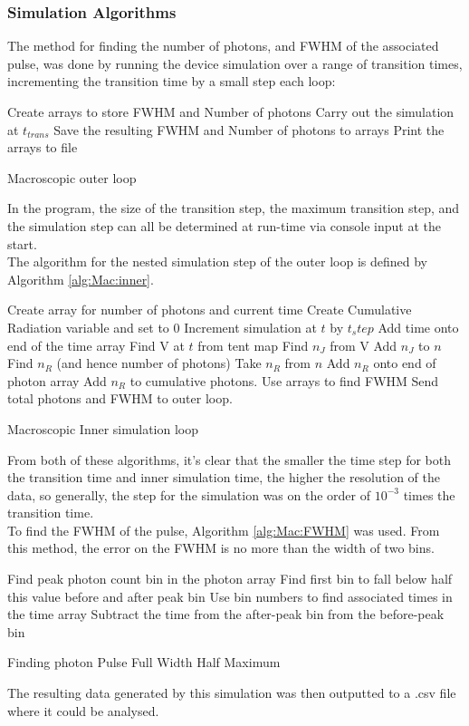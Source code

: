 \documentclass[titlepage]{article}
\begin{document}
\subsubsection{Simulation Algorithms}
The method for finding the number of photons, and FWHM of the associated pulse, was done by running the device simulation over a range of transition times, incrementing the transition time by a small step each loop:\\
\begin{algorithm}[H]
	Create arrays to store FWHM and Number of photons\; 
	{
		Carry out the simulation at $t_{trans}$\;
		Save the resulting FWHM and Number of photons to arrays\;
	}
	Print the arrays to file\;
	\caption{Macroscopic outer loop \label{alg:Mac:outer}}
\end{algorithm}
\bigskip
In the program, the size of the transition step, the maximum transition step, and the simulation step can all be determined at run-time via console input at the start.\\
The algorithm for the nested simulation step of the outer loop is defined by Algorithm \ref{alg:Mac:inner}.\\
\begin{algorithm}[H]
	Create array for number of photons and current time\;
	Create Cumulative Radiation variable and set to 0\;
	{
		Increment simulation at $t$ by $t_step$\;
		Add time onto end of the time array\;
		Find V at $t$ from tent map\;
		Find $n_J$ from V \;
		Add $n_J$ to $n$\;
		Find $n_R$ (and hence number of photons)\;
		Take $n_R$ from $n$\;
		Add $n_R$ onto end of photon array\;
		Add $n_R$ to cumulative photons.\;
	}
	Use arrays to find FWHM\;
	Send total photons and FWHM to outer loop.\;
	\caption{Macroscopic Inner simulation loop \label{alg:Mac:inner}}
\end{algorithm}
\bigskip
From both of these algorithms, it's clear that the smaller the time step for both the transition time and inner simulation time, the higher the resolution of the data, so generally, the step for the simulation was on the order of $10^{-3}$ times the transition time.\\
To find the FWHM of the pulse, Algorithm \ref{alg:Mac:FWHM} was used. From this method, the error on the FWHM is no more than the width of two bins.\\
\begin{algorithm}[H]
	Find peak photon count bin in the photon array\;
	Find first bin to fall below half this value before and after peak bin\;
	Use bin numbers to find associated times in the time array\;
	Subtract the time from the after-peak bin from the before-peak bin\;
\caption{Finding photon Pulse Full Width Half Maximum \label{alg:Mac:FWHM}}
\end{algorithm}
\bigskip
The resulting data generated by this simulation was then outputted to a .csv file where it could be analysed.
\end{document}
